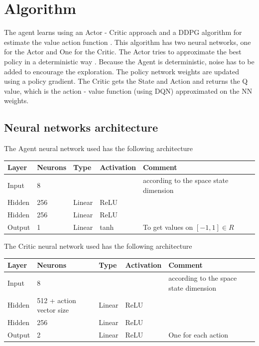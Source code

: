 \documentclass{article}
\begin{document}
\section{Algorithm}
The agent learns using an Actor - Critic \cite{ddpg} approach and a DDPG algorithm for estimate the value action function .\newline
This algorithm has two neural networks, one for the Actor and One for the Critic. 
The Actor tries to approximate the best policy in a deterministic way \newline.
Because the Agent is deterministic, noise has to be added to encourage the exploration.\newline
The policy network weights are updated using a policy gradient.\newline
The Critic gets the State and Action and returns the Q value, which is the action - value function (using DQN) approximated on the NN weights.\newline
\subsection{Neural networks architecture}
The Agent neural network used has the following architecture
\begin{table}[!htbp]
\center
\begin{tabular}{l|l|l|l|l}
Layer         & Neurons   & Type & Activation & Comment  \\
\hline
Input  &  8 &	&	& according to the space state dimension\\
Hidden & 256 &	Linear &	ReLU &\\	
Hidden & 256 &	Linear &	ReLU &\\ 	
Output &   1 &	Linear &	tanh & To get values on $[-1,1] \in R$ 
\end{tabular}
\end{table}

The Critic neural network used has the following architecture
\begin{table}[!htbp]
\center
\begin{tabular}{l|l|l|l|l}
Layer         & Neurons   & Type & Activation & Comment  \\
\hline
Input  &  8 &	&	& according to the space state dimension\\
Hidden &  512 + action vector size &	Linear &	ReLU &\\	
Hidden &  256 &	Linear &	ReLU &\\ 	
Output &   2 &	Linear &	ReLU & One for each action
\end{tabular}
\end{table}
\end{document}
